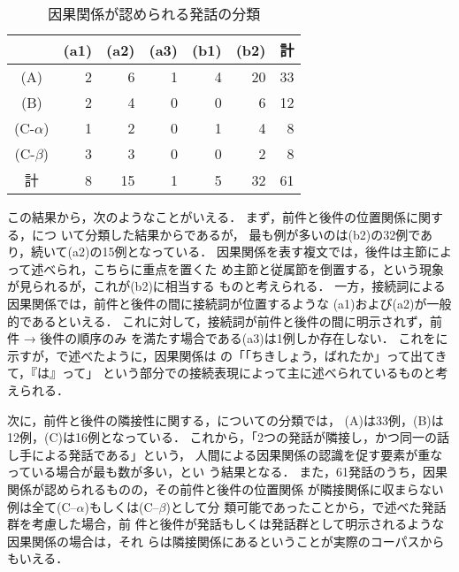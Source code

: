 \begin{table}[htbp]
\caption{因果関係が認められる発話の分類}
\begin{center}
 \begin{tabular}{|c|r|r|r|r|r||r|} \hline
   & (a1) & (a2) & (a3) & (b1) & (b2) & 計\\ \hline
  (A) & 2 & 6 & 1 & 4 & 20 & 33 \\ \hline
  (B) & 2 & 4 & 0 & 0 & 6 & 12 \\ \hline
  (C-$\alpha$) & 1 & 2 & 0 & 1 & 4 & 8 \\ \hline
  (C-$\beta$) & 3 & 3 & 0 & 0 & 2 & 8 \\ \hline\hline
  計 & 8 & 15 & 1 & 5 & 32 & 61 \\ \hline
 \end{tabular}
\end{center}

\end{table}
この結果から，次のようなことがいえる．
まず，前件と後件の位置関係に関する，につ
いて分類した結果からであるが，
最も例が多いのは(b2)の32例であり，続いて(a2)の15例となっている．
因果関係を表す複文では，後件は主節によって述べられ，こちらに重点を置くた
め主節と従属節を倒置する，という現象が見られるが，これが(b2)に相当する
ものと考えられる．
一方，接続詞による因果関係では，前件と後件の間に接続詞が位置するような
(a1)および(a2)が一般的であるといえる．
これに対して，接続詞が前件と後件の間に明示されず，前件 → 後件の順序のみ
を満たす場合である(a3)は1例しか存在しない．
これをに示すが，で述べたように，因果関係は
の「「ちきしょう，ばれたか」って出てきて，『は\ua 』って」
という部分での接続表現によって主に述べられているものと考えられる．

次に，前件と後件の隣接性に関する，についての分類では，
(A)は33例，(B)は12例，(C)は16例となっている．
これから，「2つの発話が隣接し，かつ同一の話し手による発話である」という，
人間による因果関係の認識を促す要素が重なっている場合が最も数が多い，とい
う結果となる．
また，61発話のうち，因果関係が認められるものの，その前件と後件の位置関係
が隣接関係に収まらない例は全て(C--$\alpha$)もしくは(C--$\beta$)として分
類可能であったことから，で述べた発話群を考慮した場合，前
件と後件が発話もしくは発話群として明示されるような因果関係の場合は，それ
らは隣接関係にあるということが実際のコーパスからもいえる．

